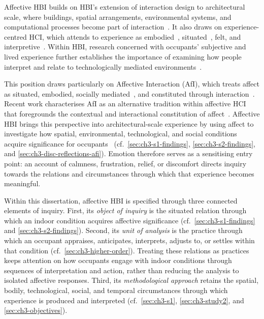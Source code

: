 Affective HBI builds on HBI's extension of interaction design to architectural scale, where buildings, spatial arrangements, environmental systems, and computational processes become part of interaction~\cite{wiberg2020interaction,schnadelbach2019adaptive}. It also draws on experience-centred HCI, which attends to experience as embodied~\cite{hook2018designing}, situated~\cite{dourish2001action}, felt, and interpretive~\cite{mccarthy2004technology,wright2008empathy}. Within HBI, research concerned with occupants' subjective and lived experience further establishes the importance of examining how people interpret and relate to technologically mediated environments~\cite{rao2023towards, margariti2023understanding}.

This position draws particularly on Affective Interaction (AfI), which treats affect as situated, embodied, socially mediated~\cite{lottridge2011affective,ahmadpour2025affective}, and constituted through interaction~\cite{boehner2005affect,boehner2007emotion}. Recent work characterises AfI as an alternative tradition within affective HCI that foregrounds the contextual and interactional constitution of affect~\cite{ahmadpour2025affective}.  Affective HBI brings this perspective into architectural-scale experience by using affect to investigate how spatial, environmental, technological, and social conditions acquire significance for occupants~\cite{paraschivoiu2022affective} (cf.~\autoref{sec:ch3-s1-findings}, \autoref{sec:ch3-s2-findings}, and \autoref{sec:ch3-disc-reflections-afi}). Emotion therefore serves as a sensitising entry point: an account of calmness, frustration, relief, or discomfort directs inquiry towards the relations and circumstances through which that experience becomes meaningful.

Within this dissertation, affective HBI is specified through three connected elements of inquiry. First, its \emph{object of inquiry} is the situated relation through which an indoor condition acquires affective significance (cf.~\autoref{sec:ch3-s1-findings} and \autoref{sec:ch3-s2-findings}). Second, its \emph{unit of analysis} is the practice through which an occupant appraises, anticipates, interprets, adjusts to, or settles within that condition (cf.~\autoref{sec:ch3-higher-order}). Treating these relations as practices keeps attention on how occupants engage with indoor conditions through sequences of interpretation and action, rather than reducing the analysis to isolated affective responses. Third, its \emph{methodological approach} retains the spatial, bodily, technological, social, and temporal circumstances through which experience is produced and interpreted (cf.~\autoref{sec:ch3-s1}, \autoref{sec:ch3-study2}, and \autoref{sec:ch3-objectives}).

